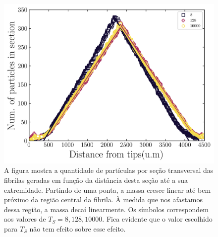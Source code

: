 \documentclass[11pt,a4paper]{article} %
\begin{document}
     
        \begin{figure}[H] 

            \centering 
            \includegraphics[width=\textwidth]{figures/length.png} 
            \caption{A figura mostra a quantidade de partículas por seção transversal das fibrilas geradas em função da  
            distância desta seção até a sua extremidade. Partindo de uma ponta, a massa cresce linear até bem próximo  
            da região central da fibrila. À medida que nos afastamos dessa região, a massa decaí linearmente. Os símbolos  
            correspondem aos  valores de $T_{S} = 8, 128, 10000$. Fica evidente que o valor escolhido para $T_{S}$ não tem  
            efeito sobre esse efeito.}
            \label{R2} 

        \end{figure} 
\end{document}
